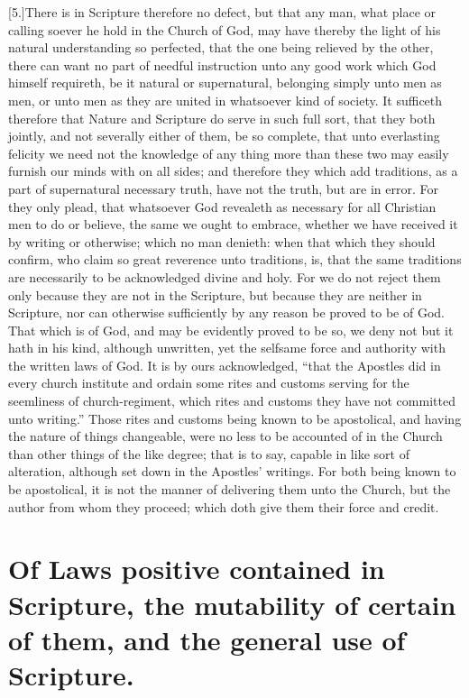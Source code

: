 [5.]There is in Scripture therefore no defect, but that any man, what place or calling soever he hold in the Church of God, may have thereby the light of his natural understanding so perfected, that the one being relieved by the other, there can want no part of needful instruction unto any good work which God himself requireth, be it natural or supernatural, belonging simply unto men as men, or unto men as they are united in whatsoever kind of society. It sufficeth therefore that Nature and Scripture do serve in such full sort, that they both jointly, and not severally either of them, be so complete, that unto everlasting felicity we need not the knowledge of any thing more than these two may easily furnish our minds with on all sides; and therefore they which add traditions, as a part of supernatural necessary truth, have not the truth, but are in error. For they only plead, that whatsoever God revealeth as necessary for all  Christian men to do or believe, the same we ought to embrace, whether we have received it by writing or otherwise; which no man denieth: when that which they should confirm, who claim so great reverence unto traditions, is, that the same traditions are necessarily to be acknowledged divine and holy. For we do not reject them only because they are not in the Scripture, but because they are neither in Scripture, nor can otherwise sufficiently by any reason be proved to be of God. That which is of God, and may be evidently proved to be so, we deny not but it hath in his kind, although unwritten, yet the selfsame force and authority with the written laws of God. It is by ours acknowledged, “that the Apostles did in every church institute and ordain some rites and customs serving for the seemliness of church-regiment, which rites and customs they have not committed unto writing.” Those rites and customs being known to be apostolical, and having the nature of things changeable, were no less to be accounted of in the Church than other things of the like degree; that is to say, capable in like sort of alteration, although set down in the Apostles’ writings. For both being known to be apostolical, it is not the manner of delivering them unto the Church, but the author from whom they proceed; which doth give them their force and credit.

\section*{Of Laws positive contained in Scripture, the mutability of certain of them, and the general use of Scripture.}


